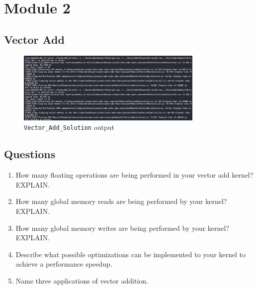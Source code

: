 \documentclass[../main.tex]{subfiles}
\begin{document}
\pagestyle{fancy}

\section{Module 2}

\subsection*{Vector Add}

\begin{figure}
    [ht]
    \centering
    \includegraphics[width=0.8\textwidth]{vectoradd.png}
    \caption{\texttt{Vector\_Add\_Solution} output}
\end{figure}

\subsection*{Questions}

\begin{enumerate}
    \item How many floating operations are being performed in your vector add
    kernel? EXPLAIN.

    

    \item How many global memory reads are being performed by your kernel?
    EXPLAIN.
    
    \item How many global memory writes are being performed by your kernel?
    EXPLAIN.
    
    \item Describe what possible optimizations can be implemented to your kernel
    to achieve a performance speedup.
    
    \item Name three applications of vector addition.
\end{enumerate}
\end{document}
